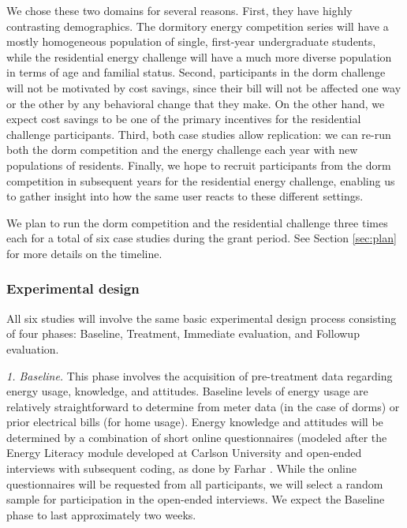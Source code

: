 We chose these two domains for several reasons. First, they have highly
contrasting demographics.  The dormitory energy competition series will
have a mostly homogeneous population of single, first-year undergraduate
students, while the residential energy challenge will have a much more
diverse population in terms of age and familial status.  Second,
participants in the dorm challenge will not be motivated by cost savings,
since their bill will not be affected one way or the other by any
behavioral change that they make. On the other hand, we expect cost savings
to be one of the primary incentives for the residential challenge
participants.  Third, both case studies allow replication: we can re-run
both the dorm competition and the energy challenge each year with new
populations of residents.  Finally, we hope to recruit participants from
the dorm competition in subsequent years for the residential energy
challenge, enabling us to gather insight into how the same user reacts to
these different settings. 

We plan to run the dorm competition and the residential challenge three
times each for a total of six case studies during the grant period.  See
Section \ref{sec:plan} for more details on the timeline.

\subsubsection{Experimental design}

All six studies will involve the same basic experimental design process
consisting of four phases: Baseline, Treatment, Immediate evaluation, and
Followup evaluation.

{\em 1. Baseline.}  This phase involves the acquisition of
pre-treatment data regarding energy usage, knowledge, and attitudes.
Baseline levels of energy usage are relatively straightforward to determine
from meter data (in the case of dorms) or prior electrical bills (for home
usage).  Energy knowledge and attitudes will be determined by a combination
of short online questionnaires (modeled after the Energy Literacy module
developed at Carlson University \cite{DeWaters09,DeWaters09b} and
open-ended interviews with subsequent coding, as done by Farhar
\cite{Farhar09}. While the online questionnaires will be requested from all
participants, we will select a random sample for participation in the
open-ended interviews.  We expect the Baseline phase to last approximately
two weeks. 

